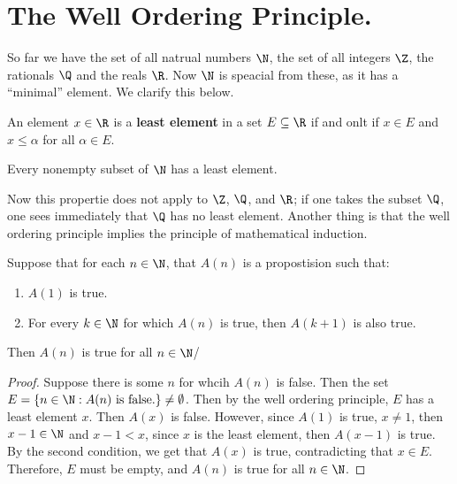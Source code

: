 
\section{The Well Ordering Principle.}

So far we have the set of all natrual numbers $\N$, the set of all integers $\Z$, the rationals $\Q$ and the reals $\R$. 
Now $\N$ is speacial from these, as it has a ``minimal'' element. We clarify this below.

\begin{definition}
    An element $x \in \R$ is a \textbf{least element} in a set $E \subseteq \R$ if and onlt if $x \in E$ and $x \leq \alpha$ 
    for all $\alpha \in E$.
\end{definition}

\begin{postulate}
  Every nonempty subset of $\N$ has a least element.
\end{postulate}

Now this propertie does not apply to $\Z$, $\Q$, and $\R$; if one takes the subset $\Q$, one sees immediately that $\Q$ has 
no least element. Another thing is that the well ordering principle implies the principle of mathematical induction.

\begin{theorem}
  Suppose that for each $n \in \N$, that $A(n)$ is a propostision such that:
      \begin{enumerate}[label=(\arabic*)]
        \item $A(1)$ is true.

        \item For every $k \in \N$ for which $A(n)$ is true, then $A(k+1)$ is also true.
      \end{enumerate}
    Then $A(n)$ is true for all $n \in \N$/
\end{theorem}
\begin{proof}
  Suppose there is some $n$ for whcih $A(n)$ is false. Then the set $E=\{n \in \N: A(n) \text{ is false.}\} \neq \emptyset$. 
  Then by the well ordering principle, $E$ has a least element $x$. Then $A(x)$ is false. However, since $A(1)$ is true, 
  $x \neq 1$, then $x-1 \in \N$ and $x-1<x$, since $x$ is the least element, then $A(x-1)$ is true. By the second condition, 
  we get that $A(x)$ is true, contradicting that $x \in E$. Therefore, $E$ must be empty, and $A(n)$ is true for all 
  $n \in \N$.
\end{proof}

